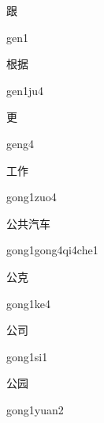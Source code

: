 \begin{multicols*}{2}
\begin{verbete}[gen1]{跟}
\begin{pronuncia}{gen1}
\end{pronuncia}
\end{verbete}

\begin{verbete}[gen1ju4]{根据}
\begin{pronuncia}{gen1ju4}
\end{pronuncia}
\end{verbete}

\begin{verbete}[geng4]{更}
\begin{pronuncia}{geng4}
\end{pronuncia}
\end{verbete}

\begin{verbete}{工作}
\begin{pronuncia}{gong1zuo4}
\end{pronuncia}
\end{verbete}

\begin{verbete}{公共汽车}
\begin{pronuncia}{gong1gong4qi4che1}
\end{pronuncia}
\end{verbete}

\begin{verbete}[gong1ke4]{公克}
\begin{pronuncia}{gong1ke4}
\end{pronuncia}
\end{verbete}

\begin{verbete}[gong1si1]{公司}
\begin{pronuncia}{gong1si1}
\end{pronuncia}
\end{verbete}

\begin{verbete}{公园}
\begin{pronuncia}{gong1yuan2}
\end{pronuncia}
\end{verbete}


\end{multicols*}
